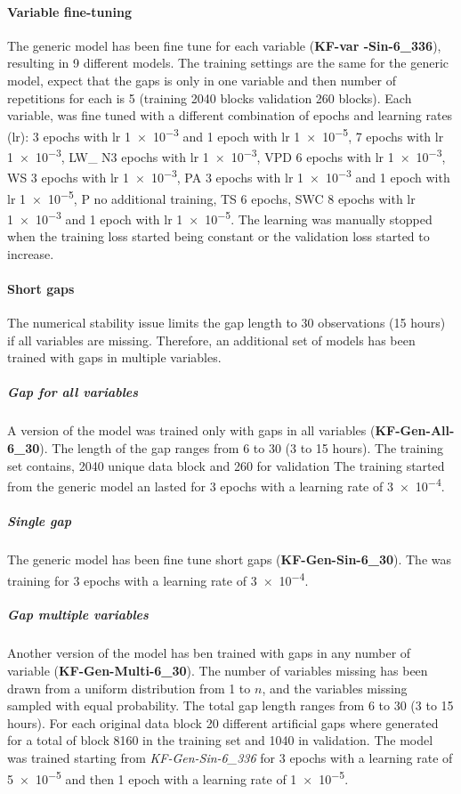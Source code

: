 \documentclass{article}
\begin{document}
\paragraph{Variable fine-tuning} The generic model has been fine tune for each variable (\textbf{KF-\textlangle var \textrangle-Sin-6\_336}), resulting in 9 different models. The training settings are the same for the generic model, expect that the gaps is only in one variable and then number of repetitions for each is 5 (training 2040 blocks validation 260 blocks). Each variable, was fine tuned with a different combination of epochs and learning rates (lr):  3 epochs with lr \num{1e-3} and 1 epoch with lr \num{1e-5},  \num{7} epochs with lr \num{1e-3}, LW\_ N\num{3} epochs with lr \num{1e-3}, VPD \num{6} epochs with lr \num{1e-3}, WS \num{3} epochs with lr \num{1e-3}, PA \num{3} epochs with lr \num{1e-3} and 1 epoch with lr \num{1e-5}, P no additional training, TS \num{6} epochs, SWC \num{8} epochs with lr \num{1e-3} and 1 epoch with lr \num{1e-5}. The learning was manually stopped when the training loss started being constant or the validation loss started to increase.

\paragraph{Short gaps} The numerical stability issue limits the gap length to 30 observations (15 hours) if all variables are missing. Therefore, an additional set of models has been trained with gaps in multiple variables.  

\subparagraph{Gap for all variables} A version of the model was trained only with gaps in all variables (\textbf{KF-Gen-All-6\_30}). The length of the gap ranges from 6 to 30 (3 to 15 hours). The training set contains, 2040 unique data block and 260 for validation The training started from the generic model an lasted for 3 epochs with a learning rate of \num{3e-4}.

\subparagraph{Single gap} The generic model has been fine tune short gaps (\textbf{KF-Gen-Sin-6\_30}). The was training for 3 epochs with a learning rate of \num{3e-4}.

\subparagraph{Gap multiple variables} Another version of the model has ben trained with gaps in any number of variable (\textbf{KF-Gen-Multi-6\_30}). The number of variables missing has been drawn from a uniform distribution  from 1 to $n$, and the variables missing sampled with equal probability. The total gap length ranges from 6 to 30 (3 to 15 hours). For each original data block 20 different artificial gaps where generated for a total of block 8160 in the training set and 1040 in validation. The model was trained starting from \textit{KF-Gen-Sin-6\_336} for 3 epochs with a learning rate of \num{5e-5} and then 1 epoch with a learning rate of \num{1e-5}.
\end{document}
